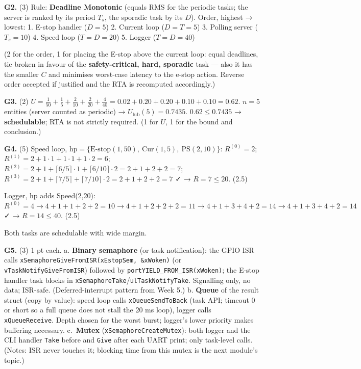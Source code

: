 \documentclass[
  11pt,
]{article}
\begin{document}
\textbf{G2.} (3) Rule: \textbf{Deadline Monotonic} (equals RMS for the
periodic tasks; the server is ranked by its period \(T_s\), the sporadic
task by its \(D\)). Order, highest → lowest: 1. E-stop handler
(\(D = 5\)) 2. Current loop (\(D = T = 5\)) 3. Polling server
(\(T_s = 10\)) 4. Speed loop (\(T = D = 20\)) 5. Logger (\(T = D = 40\))

(2 for the order, 1 for placing the E-stop above the current loop: equal
deadlines, tie broken in favour of the \textbf{safety-critical, hard,
sporadic} task --- also it has the smaller \(C\) and minimises
worst-case latency to the e-stop action. Reverse order accepted if
justified and the RTA is recomputed accordingly.)

\textbf{G3.} (2)
\(U = \tfrac1{50} + \tfrac15 + \tfrac2{10} + \tfrac2{20} + \tfrac4{40} = 0.02 + 0.20 + 0.20 + 0.10 + 0.10 = 0.62\).
\(n = 5\) entities (server counted as periodic) →
\(U_{\text{lub}}(5) = 0.7435\). \(0.62 \le 0.7435\) →
\textbf{schedulable}; RTA is not strictly required. (1 for \(U\), 1 for
the bound and conclusion.)

\textbf{G4.} (5) Speed loop,
\(\text{hp} = \{\text{E-stop}(1,50),\ \text{Cur}(1,5),\ \text{PS}(2,10)\}\):
\(R^{(0)} = 2\); \(R^{(1)} = 2 + 1\cdot1 + 1\cdot1 + 1\cdot2 = 6\);
\(R^{(2)} = 2 + 1 + \lceil 6/5 \rceil \cdot 1 + \lceil 6/10 \rceil \cdot 2 = 2 + 1 + 2 + 2 = 7\);
\(R^{(3)} = 2 + 1 + \lceil 7/5 \rceil + \lceil 7/10 \rceil \cdot 2 = 2 + 1 + 2 + 2 = 7\)
✓ → \textbf{\(R = 7 \le 20\)}. (2.5)

Logger, \(\text{hp}\) adds Speed(2,20):
\(R^{(0)} = 4 \to 4 + 1 + 1 + 2 + 2 = 10 \to 4 + 1 + 2 + 2 + 2 = 11 \to 4 + 1 + 3 + 4 + 2 = 14 \to 4 + 1 + 3 + 4 + 2 = 14\)
✓ → \textbf{\(R = 14 \le 40\)}. (2.5)

Both tasks are schedulable with wide margin.

\textbf{G5.} (3) 1 pt each. a. \textbf{Binary semaphore} (or task
notification): the GPIO ISR calls
\texttt{xSemaphoreGiveFromISR(xEstopSem,\ \&xWoken)} (or
\texttt{vTaskNotifyGiveFromISR}) followed by
\texttt{portYIELD\_FROM\_ISR(xWoken)}; the E-stop handler task blocks in
\texttt{xSemaphoreTake}/\texttt{ulTaskNotifyTake}. Signalling only, no
data; ISR-safe. (Deferred-interrupt pattern from Week 5.) b.
\textbf{Queue} of the result struct (copy by value): speed loop calls
\texttt{xQueueSendToBack} (task API; timeout 0 or short so a full queue
does not stall the 20 ms loop), logger calls \texttt{xQueueReceive}.
Depth chosen for the worst burst; logger's lower priority makes
buffering necessary. c.~\textbf{Mutex} (\texttt{xSemaphoreCreateMutex}):
both logger and the CLI handler \texttt{Take} before and \texttt{Give}
after each UART print; only task-level calls. (Notes: ISR never touches
it; blocking time from this mutex is the next module's topic.)
\end{document}
